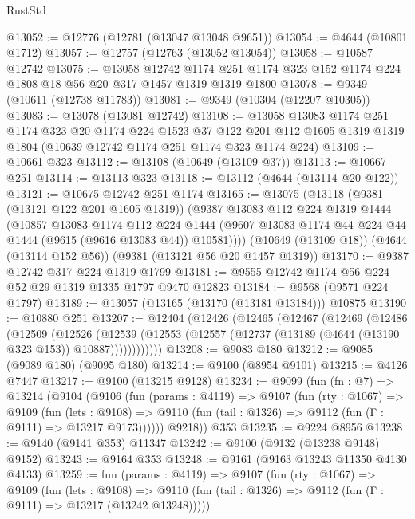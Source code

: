 \begin{lexlean}{RustStd}
\begin{coremodule}
@13052 := @12776 (@12781 (@13047 @13048 @9651))
@13054 := @4644 (@10801 @1712)
@13057 := @12757 (@12763 (@13052 @13054))
@13058 := @10587 @12742
@13075 := @13058
    @12742
    @1174
    @251
    @1174
    @323
    @152
    @1174
    @224
    @1808
    @18
    @56
    @20
    @317
    @1457
    @1319
    @1319
    @1800
@13078 := @9349 (@10611 (@12738 @11783))
@13081 := @9349 (@10304 (@12207 @10305))
@13083 := @13078 (@13081 @12742)
@13108 := @13058
    @13083
    @1174
    @251
    @1174
    @323
    @20
    @1174
    @224
    @1523
    @37
    @122
    @201
    @112
    @1605
    @1319
    @1319
    @1804
    (@10639 @12742 @1174 @251 @1174 @323 @1174 @224)
@13109 := @10661 @323
@13112 := @13108 (@10649 (@13109 @37))
@13113 := @10667 @251
@13114 := @13113 @323
@13118 := @13112 (@4644 (@13114 @20 @122))
@13121 := @10675 @12742 @251 @1174
@13165 := @13075
    (@13118
      (@9381 (@13121 @122 @201 @1605 @1319))
      (@9387
        @13083
        @112
        @224
        @1319
        @1444
        (@10857
          @13083
          @1174
          @112
          @224
          @1444
          (@9607 @13083 @1174 @44 @224 @44 @1444 (@9615 (@9616 @13083 @44)) @10581))))
    (@10649 (@13109 @18))
    (@4644 (@13114 @152 @56))
    (@9381 (@13121 @56 @20 @1457 @1319))
@13170 := @9387 @12742 @317 @224 @1319 @1799
@13181 := @9555 @12742 @1174 @56 @224 @52 @29 @1319 @1335 @1797 @9470 @12823
@13184 := @9568 (@9571 @224 @1797)
@13189 := @13057 (@13165 (@13170 (@13181 @13184))) @10875
@13190 := @10880 @251
@13207 := @12404
    (@12426
      (@12465
        (@12467
          (@12469
            (@12486
              (@12509
                (@12526
                  (@12539
                    (@12553 (@12557 (@12737 (@13189 (@4644 (@13190 @323 @153)) @10887))))))))))))
@13208 := @9083 @180
@13212 := @9085 (@9089 @180) (@9095 @180)
@13214 := @9100 (@8954 @9101)
@13215 := @4126 @7447
@13217 := @9100 (@13215 @9128)
@13234 := @9099
    (fun (fn : @7) =>
    @13214
      (@9104
        (@9106
          (fun (params : @4119) =>
          @9107
            (fun (rty : @1067) =>
            @9109
              (fun (lets : @9108) =>
              @9110 (fun (tail : @1326) => @9112 (fun (Γ : @9111) => @13217 @9173))))))
        @9218))
    @353
@13235 := @9224 @8956
@13238 := @9140 (@9141 @353) @11347
@13242 := @9100 (@9132 (@13238 @9148) @9152)
@13243 := @9164 @353
@13248 := @9161 (@9163 @13243 @11350 @4130 @4133)
@13259 := fun (params : @4119) =>
  @9107
    (fun (rty : @1067) =>
    @9109
      (fun (lets : @9108) =>
      @9110 (fun (tail : @1326) => @9112 (fun (Γ : @9111) => @13217 (@13242 @13248)))))

\end{coremodule}
\end{lexlean}
